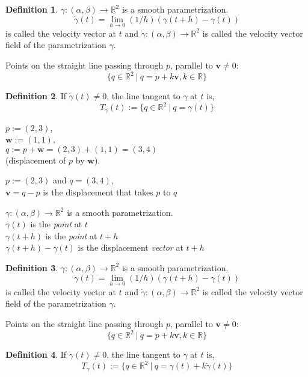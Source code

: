 \documentclass[twocolumn,20pt,fleqn]{extarticle}
\newcommand{\sep}{\vspace{0.5cm}}
\theoremstyle{plain}
\theoremstyle{definition}
\newtheorem*{definition}{Definition}
\theoremstyle{remark}
\begin{document}
\begin{definition}
$\gamma : (\alpha,\beta) \to \mathbb{R}^2$ is a smooth parametrization.
\[\dot{\gamma}(t) = \lim_{h\to 0} (1/h)(\gamma(t+h) - \gamma(t))\]
is called the velocity vector at $t$ and $\dot{\gamma} : (\alpha, \beta) \to \mathbb{R}^2$ is called the velocity vector field of the parametrization $\gamma$.
\end{definition}
\newpage
Points on the straight line passing through $p$, parallel to $\mathbf{v}\neq 0$:
\[\{q \in \mathbb{R}^2 \ |\ q = p  + k\mathbf{v} , k \in \mathbb{R}\}\]

\begin{definition}
  If $\dot{\gamma}(t)\neq 0$, the line tangent to $\gamma$ at $t$ is,
  \[T_\gamma(t):=\{q \in \mathbb{R}^2 \ |\ q = \gamma(t)\}\]\end{definition}


\clearpage



$p := (2,3)$,\\ $\mathbf{w} := (1,1)$,\\ $q:=p + \mathbf{w} = (2,3) + (1,1) = (3,4)$ \\ (displacement of $p$ by $\mathbf{w}$).

\sep
$p := (2,3)$ and $q=(3,4)$,\\
$\mathbf{v}= q - p$ is the displacement that takes $p$ to $q$ 
\sep

$\gamma : (\alpha,\beta) \to \mathbb{R}^2$ is a smooth parametrization.\\
$\gamma(t)$ is the \emph{point} at $t$\\
$\gamma(t+h)$ is the \emph{point} at $t+h$\\
$\gamma(t+h)-\gamma(t)$ is the displacement \emph{vector} at $t+h$\\



\begin{definition}
$\gamma : (\alpha,\beta) \to \mathbb{R}^2$ is a smooth parametrization.
\[\dot{\gamma}(t) = \lim_{h\to 0} (1/h)(\gamma(t+h) - \gamma(t))\]
is called the velocity vector at $t$ and $\dot{\gamma} : (\alpha, \beta) \to \mathbb{R}^2$ is called the velocity vector field of the parametrization $\gamma$.
\end{definition}
\newpage
Points on the straight line passing through $p$, parallel to $\mathbf{v}\neq 0$:
\[\{q \in \mathbb{R}^2 \ |\ q = p  + k\mathbf{v} , k \in \mathbb{R}\}\]

\begin{definition}
  If $\dot{\gamma}(t)\neq 0$, the line tangent to $\gamma$ at $t$ is,
  \[T_\gamma(t):=\{q \in \mathbb{R}^2 \ |\ q = \gamma(t) + k\dot{\gamma}(t)\}\]\end{definition}
\end{document}
